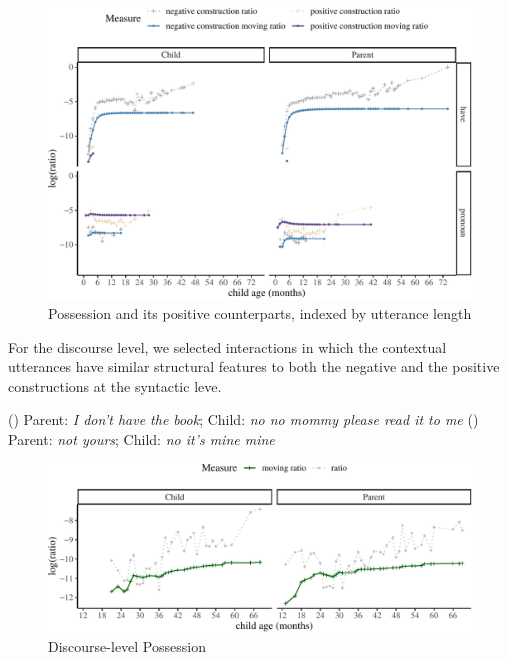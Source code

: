 \documentclass[
  english,
  man,floatsintext]{apa6}
\begin{document}
\begin{figure}[H]

{\centering \includegraphics{neg_construction_article_files/figure-latex/possessionul-1} 

}

\caption{Possession and its positive counterparts, indexed by utterance length}\label{fig:possessionul}
\end{figure}

For the discourse level, we selected interactions in which the contextual utterances have similar structural features to both the negative and the positive constructions at the syntactic leve.

() Parent: \emph{I don't have the book}; Child: \emph{no no mommy please read it to me}
() Parent: \emph{not yours}; Child: \emph{no it's mine mine}

\begin{figure}[H]

{\centering \includegraphics{neg_construction_article_files/figure-latex/possessiondiscourse-1} 

}

\caption{Discourse-level Possession}\label{fig:possessiondiscourse}
\end{figure}
\end{document}
